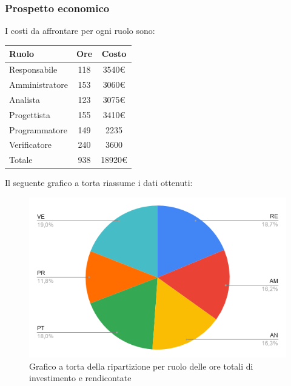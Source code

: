 {{{{{{{{{{{\subsubsection{Prospetto economico}\label{PreventivoRiepilogoOreTotaliProspettoEconomico}
I costi da affrontare per ogni ruolo sono:
\quad
\def\tabularxcolumn#1{m{#1}}
{
	\begin{center}
		\renewcommand{\arraystretch}{1.4}
		\begin{tabularx}{7cm}{|X|c|c|}
			\hline
			\rowcolor{airforceblue}
			\textbf{Ruolo} & \textbf{Ore} & \textbf{Costo}\\
			\hline
			Responsabile & 118 & 3540\euro\\
			\hline
			Amministratore & 153 & 3060\euro\\
			\hline
			Analista & 123 & 3075\euro\\
			\hline
			Progettista & 155 & 3410\euro\\
			\hline
			Programmatore & 149 & 2235\\
			\hline
			Verificatore & 240 & 3600\\
			\hline
			Totale & 938 & 18920\euro\\
			\hline
		\end{tabularx}
	\end{center}

Il seguente grafico a torta riassume i dati ottenuti:
\begin{figure}[!ht]
	\begin{center}
		\includegraphics[width=0.8\linewidth]{../immagini/pdp/torta_suddvisione_lavoro.png}
		\caption{Grafico a torta della ripartizione per ruolo delle ore totali di investimento e
			rendicontate}
	\end{center}
\end{figure}

}}}}}}}}}}}}
